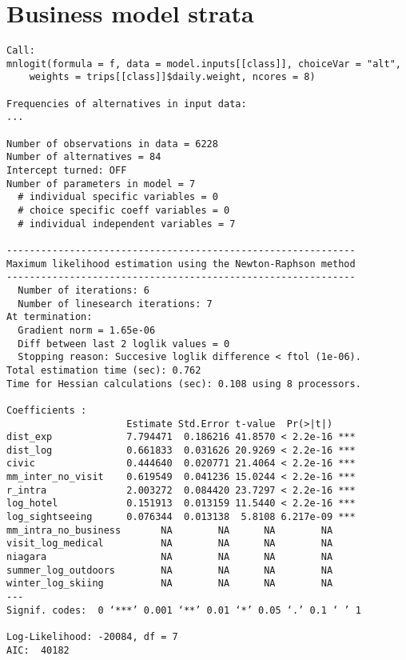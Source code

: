 \section{Business model strata}
\begin{verbatim}
Call:
mnlogit(formula = f, data = model.inputs[[class]], choiceVar = "alt", 
    weights = trips[[class]]$daily.weight, ncores = 8)

Frequencies of alternatives in input data:
...

Number of observations in data = 6228
Number of alternatives = 84
Intercept turned: OFF
Number of parameters in model = 7
  # individual specific variables = 0
  # choice specific coeff variables = 0
  # individual independent variables = 7

-------------------------------------------------------------
Maximum likelihood estimation using the Newton-Raphson method
-------------------------------------------------------------
  Number of iterations: 6
  Number of linesearch iterations: 7
At termination: 
  Gradient norm = 1.65e-06
  Diff between last 2 loglik values = 0
  Stopping reason: Succesive loglik difference < ftol (1e-06).
Total estimation time (sec): 0.762
Time for Hessian calculations (sec): 0.108 using 8 processors.

Coefficients : 
                     Estimate Std.Error t-value  Pr(>|t|)    
dist_exp             7.794471  0.186216 41.8570 < 2.2e-16 ***
dist_log             0.661833  0.031626 20.9269 < 2.2e-16 ***
civic                0.444640  0.020771 21.4064 < 2.2e-16 ***
mm_inter_no_visit    0.619549  0.041236 15.0244 < 2.2e-16 ***
r_intra              2.003272  0.084420 23.7297 < 2.2e-16 ***
log_hotel            0.151913  0.013159 11.5440 < 2.2e-16 ***
log_sightseeing      0.076344  0.013138  5.8108 6.217e-09 ***
mm_intra_no_business       NA        NA      NA        NA    
visit_log_medical          NA        NA      NA        NA    
niagara                    NA        NA      NA        NA    
summer_log_outdoors        NA        NA      NA        NA    
winter_log_skiing          NA        NA      NA        NA    
---
Signif. codes:  0 ‘***’ 0.001 ‘**’ 0.01 ‘*’ 0.05 ‘.’ 0.1 ‘ ’ 1

Log-Likelihood: -20084, df = 7
AIC:  40182 

\end{verbatim}
